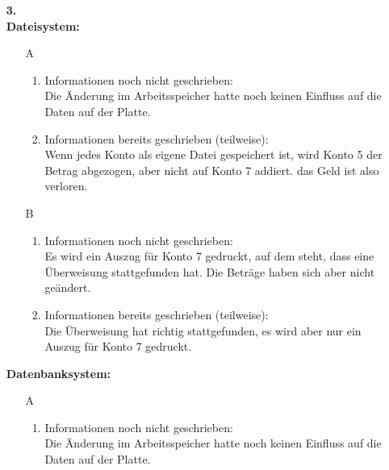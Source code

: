 \documentclass[a4paper,11pt,fleqn]{scrartcl}
\begin{document}
\begin{enumerate}
\begin{enumerate}
        \end{enumerate}
        \item[\textbf{3.}]\quad \\
        \textbf{Dateisystem:}
            \begin{enumerate}
                \item[A]
                \begin{enumerate}
                    \item Informationen noch nicht geschrieben: \\
                        Die Änderung im Arbeitsspeicher hatte noch keinen Einfluss auf die Daten auf der Platte. \\
                    \item Informationen bereits geschrieben (teilweise): \\
                        Wenn jedes Konto als eigene Datei gespeichert ist, wird Konto 5 der Betrag abgezogen, aber nicht auf 
                        Konto 7 addiert. das Geld ist also verloren. \\
                \end{enumerate}
                \item[B]
                \begin{enumerate}
                    \item Informationen noch nicht geschrieben: \\
                        Es wird ein Auszug für Konto 7 gedruckt, auf dem steht, dass eine Überweisung stattgefunden hat. Die 
                        Beträge haben sich aber nicht geändert.
                    \item Informationen bereits geschrieben (teilweise): \\
                        Die Überweisung hat richtig stattgefunden, es wird aber nur ein Auszug für Konto 7 gedruckt. \\
                \end{enumerate}
            \end{enumerate}
        \textbf{Datenbanksystem:}
        \begin{enumerate}
                \item[A]
                \begin{enumerate}
                    \item Informationen noch nicht geschrieben: \\
                        Die Änderung im Arbeitsspeicher hatte noch keinen Einfluss auf die Daten auf der Platte. \\

\end{enumerate}
\end{enumerate}
\end{enumerate}
\end{document}

